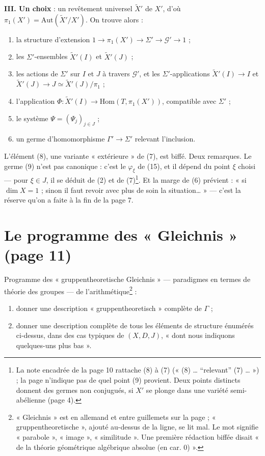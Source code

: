 \documentclass[11pt,a4paper]{article}
\begin{document}
\textbf{III. Un choix} : un revêtement universel $\widetilde X'$ de $X'$, d'où
$\pi_1(X') = \mathrm{Aut}(\widetilde X'/X')$. On trouve alors :
\begin{enumerate}
\item[(3)] la structure d'extension $1 \to \pi_1(X') \to \Sigma' \to
\mathcal{G}' \to 1$ ;
\item[(4)] les $\Sigma'$-ensembles $\widetilde X'(I)$ et $\widetilde X'(J)$ ;
\item[(5)] les actions de $\Sigma'$ sur $I$ et $J$ à travers $\mathcal{G}'$, et
les $\Sigma'$-applications $\widetilde X'(I) \to I$ et $\widetilde X'(J) \to J
\simeq \widetilde X'(J)/\pi_1$ ;
\item[(6)] l'application $\Phi : \widetilde X'(I) \to \mathrm{Hom}(T,
\pi_1(X'))$, compatible avec $\Sigma'$ ;
\item[(7)] le système $\Psi = (\Psi_j)_{j \in J}$ ;
\item[(9)] un germe d'homomorphisme $\Gamma' \to \Sigma'$ relevant
l'inclusion.
\end{enumerate}
L'élément (8), une variante « extérieure » de (7), est biffé. Deux remarques.
Le germe (9) n'est pas canonique : c'est le $\varphi_\xi$ de (15), et il
dépend du point $\xi$ choisi — pour $\xi \in J$, il se déduit de (2) et de
(7)\footnote{La note encadrée de la page 10 rattache (8) à (7) (« (8) …
“relevant” (7) … ») ; la page n'indique pas de quel point (9) provient. Deux
points distincts donnent des germes non conjugués, si $X'$ se plonge dans une
variété semi-abélienne (page 4).}. Et la marge de (6) prévient : « si $\dim X
= 1$ ; sinon il faut revoir avec plus de soin la situation… » — c'est la
réserve qu'on a faite à la fin de la page 7.

\section*{Le programme des « Gleichnis » (page 11)}

Programme des « gruppentheoretische Gleichnis » — paradigmes en termes de
théorie des groupes — de l'arithmétique\footnote{« Gleichnis » est en allemand
et entre guillemets sur la page ; « gruppentheoretische », ajouté au-dessus de
la ligne, se lit mal. Le mot signifie « parabole », « image », « similitude ».
Une première rédaction biffée disait « de la théorie géométrique algébrique
absolue (en car. 0) ».} :

\begin{enumerate}
\item[a)] donner une description « gruppentheoretisch » complète de $\Gamma$ ;
\item[b)] donner une description complète de tous les éléments de structure
énumérés ci-dessus, dans des cas typiques de $(X, D, J)$, « dont nous
indiquons quelques-uns plus bas ».
\end{enumerate}
\end{document}
